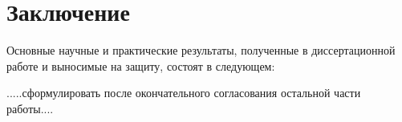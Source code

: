 \chapter*{Заключение}

Основные научные и практические результаты, полученные в
диссертационной работе и выносимые на защиту, состоят в следующем:

.....сформулировать после окончательного согласования остальной части работы....
%
%
